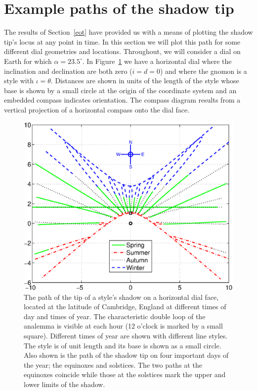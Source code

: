 \documentclass[12pt]{article}
\begin{document}
\section{Example paths of the shadow tip} \label{secPaths}
%
The results of Section~\ref{eot} have provided us with a means of plotting the shadow tip's locus at any point in time. In this section we will plot this path for some different dial geometries and locations. Throughout, we will consider a dial on Earth for which $\alpha = 23.5^\circ$. In Figure~\ref{horizDial} we have a horizontal dial where the inclination and declination are both zero ($i = d = 0$) and where the gnomon is a style with $\iota = \theta$. Distances are shown in units of the length of the style whose base is shown by a small circle at the origin of the coordinate system and an embedded compass indicates orientation. The compass diagram results from a vertical projection of a horizontal compass onto the dial face.
%
\begin{figure}[ht!]
\centering
\includegraphics[width=13cm]{figs/figure7.eps}
\caption{The path of the tip of a style's shadow on a horizontal dial face, located at the latitude of Cambridge, England at different times of day and times of year. The characteristic double loop of the analemma is visible at each hour (12 o'clock is marked by a small square). Different times of year are shown with different line styles. The style is of unit length and its base is shown as a small circle. Also shown is the path of the shadow tip on four important days of the year; the equinoxes and solstices. The two paths at the equinoxes coincide while those at the solstices mark the upper and lower limits of the shadow.\label{horizDial}}
\end{figure}
\end{document}

